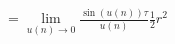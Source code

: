 \documentclass[preview]{standalone}
\begin{document}
\begin{align*}
= \lim_{u(n) \to 0} \frac {\sin \left(u(n)\right)\tau} {u(n)} \frac {1} {2} r^2
\end{align*}
\end{document}
